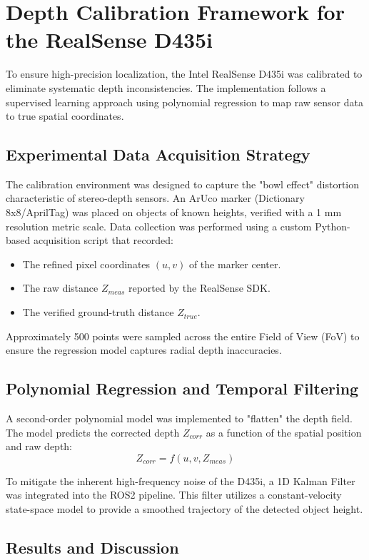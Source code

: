 \section{Depth Calibration Framework for the RealSense D435i}

To ensure high-precision localization, the Intel RealSense D435i was calibrated to eliminate systematic depth inconsistencies. The implementation follows a supervised learning approach using polynomial regression to map raw sensor data to true spatial coordinates.

\subsection{Experimental Data Acquisition Strategy}
The calibration environment was designed to capture the "bowl effect" distortion characteristic of stereo-depth sensors. An ArUco marker (Dictionary 8x8/AprilTag) was placed on objects of known heights, verified with a 1 mm resolution metric scale. Data collection was performed using a custom Python-based acquisition script that recorded:
\begin{itemize}
    \item The refined pixel coordinates $(u, v)$ of the marker center.
    \item The raw distance $Z_{meas}$ reported by the RealSense SDK.
    \item The verified ground-truth distance $Z_{true}$.
\end{itemize}
Approximately 500 points were sampled across the entire Field of View (FoV) to ensure the regression model captures radial depth inaccuracies.

\subsection{Polynomial Regression and Temporal Filtering}
A second-order polynomial model was implemented to "flatten" the depth field. The model predicts the corrected depth $Z_{corr}$ as a function of the spatial position and raw depth:
\begin{equation}
Z_{corr} = f(u, v, Z_{meas})
\end{equation}

To mitigate the inherent high-frequency noise of the D435i, a 1D Kalman Filter was integrated into the ROS2 pipeline. This filter utilizes a constant-velocity state-space model to provide a smoothed trajectory of the detected object height.
\clearpage
\subsection{Results and Discussion}

